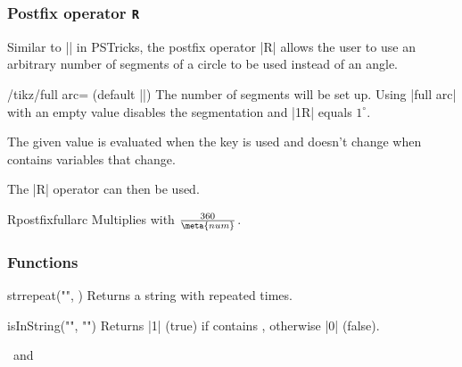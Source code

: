 \begin{multicols}{2}
\subsubsection{Postfix operator \texttt{R}}

Similar to |\segments[<num>]| in PSTricks, the postfix operator |R| allows the user
to use an arbitrary number of segments of a circle to be used instead of an angle.

\begin{key}{/tikz/full arc= (default |{}|)}
  The number  of segments will be set up.
  Using |full arc| with an empty value disables the segmentation and |1R| equals $1^\circ$.
  
  The given value  is evaluated when the key is used and doesn't change when
   contains variables that change.
\end{key}
The |R| operator can then be used.
\begin{math-operator}{R}{postfix}{fullarc}
  Multiplies  with $\frac{360}{\meta{num}}$.
\end{math-operator}

\subsubsection{Functions}

\begin{math-function}{strrepeat("", )}
\mathcommand
  Returns a string with  repeated  times.

\begin{codeexample}[]
\pgfmathresult
\end{codeexample}
\end{math-function}

\begin{math-function}{isInString("", "")}
\mathcommand
  Returns |1| (true) if  contains ,
  otherwise |0| (false).

\begin{codeexample}[]
\pgfmathresult \ and\ 
\pgfmathresult
\end{codeexample}
\end{math-function}


\end{multicols}
